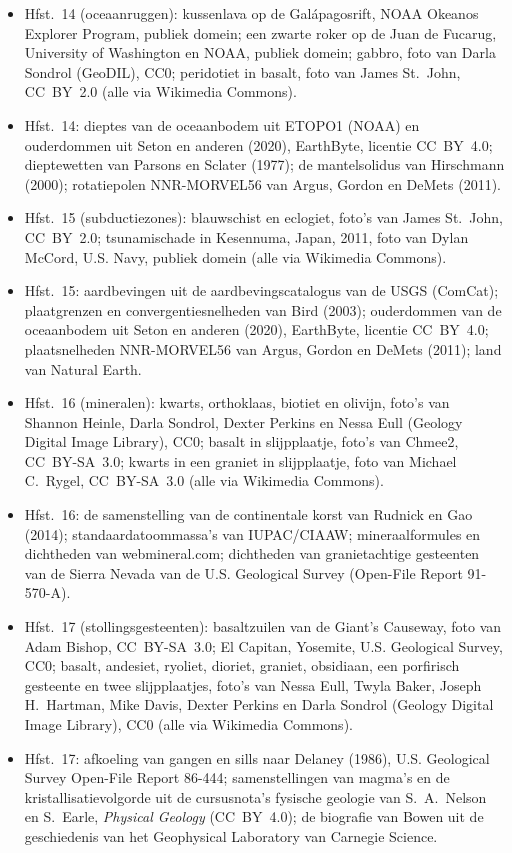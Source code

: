 \begin{itemize}
  \item Hfst.~14 (oceaanruggen): kussenlava op de Galápagosrift, NOAA Okeanos Explorer Program, publiek domein; een zwarte roker op de Juan de Fucarug, University of Washington en NOAA, publiek domein; gabbro, foto van Darla Sondrol (GeoDIL), CC0; peridotiet in basalt, foto van James St.~John, CC~BY~2.0 (alle via Wikimedia Commons).
  \item Hfst.~14: dieptes van de oceaanbodem uit ETOPO1 (NOAA) en ouderdommen uit Seton en anderen (2020), EarthByte, licentie CC~BY~4.0; dieptewetten van Parsons en Sclater (1977); de mantelsolidus van Hirschmann (2000); rotatiepolen NNR-MORVEL56 van Argus, Gordon en DeMets (2011).
  \item Hfst.~15 (subductiezones): blauwschist en eclogiet, foto's van James St.~John, CC~BY~2.0; tsunamischade in Kesennuma, Japan, 2011, foto van Dylan McCord, U.S. Navy, publiek domein (alle via Wikimedia Commons).
  \item Hfst.~15: aardbevingen uit de aardbevingscatalogus van de USGS (ComCat); plaatgrenzen en convergentiesnelheden van Bird (2003); ouderdommen van de oceaanbodem uit Seton en anderen (2020), EarthByte, licentie CC~BY~4.0; plaatsnelheden NNR-MORVEL56 van Argus, Gordon en DeMets (2011); land van Natural Earth.
  \item Hfst.~16 (mineralen): kwarts, orthoklaas, biotiet en olivijn, foto's van Shannon Heinle, Darla Sondrol, Dexter Perkins en Nessa Eull (Geology Digital Image Library), CC0; basalt in slijpplaatje, foto's van Chmee2, CC~BY-SA~3.0; kwarts in een graniet in slijpplaatje, foto van Michael C.~Rygel, CC~BY-SA~3.0 (alle via Wikimedia Commons).
  \item Hfst.~16: de samenstelling van de continentale korst van Rudnick en Gao (2014); standaardatoommassa's van IUPAC/CIAAW; mineraalformules en dichtheden van webmineral.com; dichtheden van granietachtige gesteenten van de Sierra Nevada van de U.S. Geological Survey (Open-File Report 91-570-A).
  \item Hfst.~17 (stollingsgesteenten): basaltzuilen van de Giant's Causeway, foto van Adam Bishop, CC~BY-SA~3.0; El Capitan, Yosemite, U.S. Geological Survey, CC0; basalt, andesiet, ryoliet, dioriet, graniet, obsidiaan, een porfirisch gesteente en twee slijpplaatjes, foto's van Nessa Eull, Twyla Baker, Joseph H.~Hartman, Mike Davis, Dexter Perkins en Darla Sondrol (Geology Digital Image Library), CC0 (alle via Wikimedia Commons).
  \item Hfst.~17: afkoeling van gangen en sills naar Delaney (1986), U.S. Geological Survey Open-File Report 86-444; samenstellingen van magma's en de kristallisatievolgorde uit de cursusnota's fysische geologie van S.~A.~Nelson en S.~Earle, \emph{Physical Geology} (CC~BY~4.0); de biografie van Bowen uit de geschiedenis van het Geophysical Laboratory van Carnegie Science.

\end{itemize}
